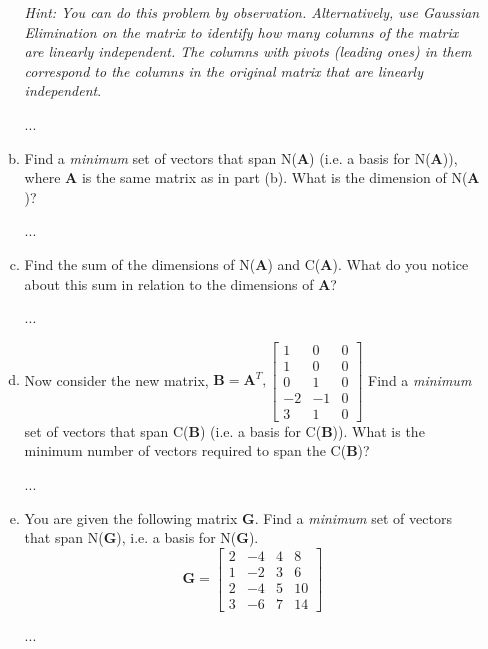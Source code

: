 \documentclass[11pt]{article}
\def\A{\textbf{A}} %
\def\B{\textbf{B}}
\def\G{\textbf{G}}
\begin{document}
\begin{enumerate}
\begin{enumerate}[(a)]
	        \textit{Hint: You can do this problem by observation. Alternatively, use Gaussian Elimination on the matrix to identify how many columns of the matrix are linearly independent. The columns with pivots (leading ones) in them correspond to the columns in the original matrix that are linearly independent}.
	        \begin{Answer}
	               ...
	        \end{Answer}
	        
	        \newpage
	        
	        \item Find a \textit{minimum} set of vectors that span N($\A$) (i.e. a basis for N($\A$)), where $\A$ is the same matrix as in part (b). What is the dimension of N($\A$)?
	        \begin{Answer}
	               ...
	        \end{Answer}
	        
            \newpage
            \item Find the sum of the dimensions of N($\A$) and C($\A$). What do you notice about this sum in relation to the dimensions of $\A$?
	        \begin{Answer}
	               ...
	        \end{Answer}
	        
	        \newpage
	        
	        \item Now consider the new matrix, $\B = \A^{T}, \begin{bmatrix}
	            1 & 0 & 0 \\
	            1 & 0 & 0 \\
	            0 & 1 & 0 \\
	            -2 & -1 & 0 \\
	            3 & 1 & 0
	        \end{bmatrix}$
	        Find a \textit{minimum} set of vectors that span C($\B$) (i.e. a basis for C($\B$)). What is the minimum number of vectors required to span the C($\B$)?
	        \begin{Answer}
	           ...
	        \end{Answer}
	        
	        
	        \newpage
	        
	        \item You are given the following matrix $\G$. Find a \textit{minimum} set of vectors that span N($\G$), i.e. a basis for N($\G$).
	        \[
	            \G = \begin{bmatrix}
	                2 & -4 & 4 & 8 \\
                    1 & -2 & 3 & 6 \\
                    2 & -4 & 5 & 10 \\
                    3 & -6 & 7 & 14
	            \end{bmatrix}
	        \]
	        \begin{Answer}
	           ...
	        \end{Answer}
	      \end{enumerate}
	      

\end{enumerate}
\end{document}
